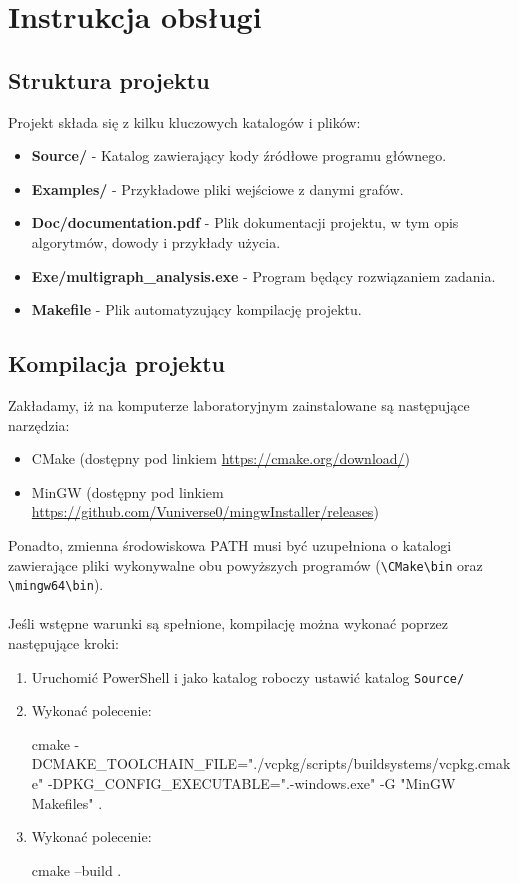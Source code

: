 \section{Instrukcja obsługi}

\subsection{Struktura projektu}

Projekt składa się z kilku kluczowych katalogów i plików:

\begin{itemize}
    \item \textbf{Source/} - Katalog zawierający kody źródłowe programu głównego.
    \item \textbf{Examples/} - Przykładowe pliki wejściowe z danymi grafów.
    \item \textbf{Doc/documentation.pdf} - Plik dokumentacji projektu, w tym opis algorytmów, dowody i przykłady użycia.
    \item \textbf{Exe/multigraph\_analysis.exe} - Program będący rozwiązaniem zadania.
    \item \textbf{Makefile} - Plik automatyzujący kompilację projektu.
\end{itemize}

\subsection{Kompilacja projektu}

Zakładamy, iż na komputerze laboratoryjnym zainstalowane są następujące narzędzia:
\begin{itemize}
	\item CMake (dostępny pod linkiem \url{https://cmake.org/download/})
	\item MinGW (dostępny pod linkiem \url{https://github.com/Vuniverse0/mingwInstaller/releases})
\end{itemize}

Ponadto, zmienna środowiskowa PATH musi być uzupełniona o katalogi zawierające pliki wykonywalne obu powyższych programów (\texttt{\textbackslash CMake\textbackslash bin} oraz \texttt{\textbackslash mingw64\textbackslash bin}).
\\\\
Jeśli wstępne warunki są spełnione, kompilację można wykonać poprzez następujące kroki:
\begin{enumerate}
	\item Uruchomić PowerShell i jako katalog roboczy ustawić katalog \texttt{Source/}
	\item Wykonać polecenie:
	\begin{spverbatim}
cmake -DCMAKE_TOOLCHAIN_FILE="./vcpkg/scripts/buildsystems/vcpkg.cmake"
-DPKG_CONFIG_EXECUTABLE=".\vcpkg\installed{}-windows\tools\pkgconf\pkgconf.exe" -G "MinGW Makefiles" .
	\end{spverbatim}
	\item Wykonać polecenie:
	\begin{spverbatim}
cmake --build .
	\end{spverbatim}
\end{enumerate}

